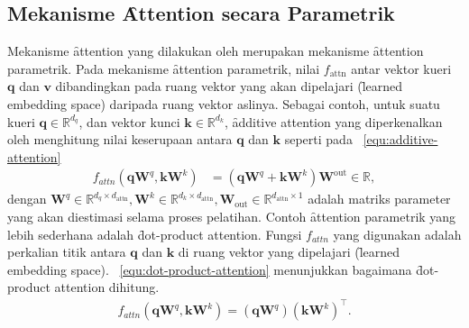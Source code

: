 	\subsection{Mekanisme \f{Attention} secara Parametrik}
	Mekanisme \f{attention} yang dilakukan oleh \cite{transformerori} merupakan mekanisme \f{attention} parametrik. Pada mekanisme \f{attention} parametrik, nilai $f_{\text{attn}}$ antar vektor kueri $\mathbf{q}$ dan $\mathbf{v}$ dibandingkan pada ruang vektor yang akan dipelajari (\f{learned embedding space}) daripada ruang vektor aslinya. Sebagai contoh, untuk suatu kueri $\mathbf{q}\in \mathbb{R}^{d_q}$, dan vektor kunci $\mathbf{k} \in \mathbb{R}^{d_k}$, \f{additive attention} yang diperkenalkan oleh \cite{bahdanau2016neural} menghitung nilai keserupaan antara $\mathbf{q}$ dan $\mathbf{k}$ seperti pada \equ~\ref{equ:additive-attention}
	\begin{align}
	\label{equ:additive-attention}
	f_{attn}(\mathbf{q} \mathbf{W}^q, \mathbf{k} \mathbf{W}^k) &= (\mathbf{q} \mathbf{W}^q  + \mathbf{k} \mathbf{W}^k)  \mathbf{W}^{\text{out}} \in \mathbb{R},
	\end{align}
	dengan $\mathbf{W}^q \in \mathbb{R}^{d_q \times d_{\text{attn}}}, \mathbf{W}^k \in \mathbb{R}^{d_k \times d_{\text{attn}}}, \mathbf{W}_{\text{out}} \in \mathbb{R}^{d_{\text{attn}} \times 1}$ adalah matriks parameter yang akan diestimasi selama proses pelatihan. Contoh \f{attention} parametrik yang lebih sederhana adalah \f{dot-product attention}. Fungsi $f_{attn}$ yang digunakan adalah perkalian titik antara $\mathbf{q}$ dan $\mathbf{k}$ di ruang vektor yang dipelajari (\f{learned embedding space}). \equ~\ref{equ:dot-product-attention} menunjukkan bagaimana \f{dot-product attention} dihitung.
	\begin{align}
		\label{equ:dot-product-attention}
		f_{attn}(\mathbf{q} \mathbf{W}^q, \mathbf{k} \mathbf{W}^k) = (\mathbf{q} \mathbf{W}^q) (\mathbf{k} \mathbf{W}^k)^{\top}.
	\end{align}

